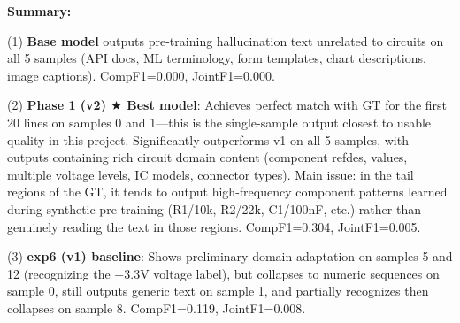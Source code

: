 \textbf{Summary:}

(1) \textbf{Base model} outputs pre-training hallucination text unrelated to circuits on all 5 samples (API docs, ML terminology, form templates, chart descriptions, image captions). CompF1=0.000, JointF1=0.000.

(2) \textbf{Phase 1 (v2) $\bigstar$ Best model}: Achieves perfect match with GT for the first 20 lines on samples 0 and 1---this is the single-sample output closest to usable quality in this project. Significantly outperforms v1 on all 5 samples, with outputs containing rich circuit domain content (component refdes, values, multiple voltage levels, IC models, connector types). Main issue: in the tail regions of the GT, it tends to output high-frequency component patterns learned during synthetic pre-training (R1/10k, R2/22k, C1/100nF, etc.) rather than genuinely reading the text in those regions. CompF1=0.304, JointF1=0.005.

(3) \textbf{exp6 (v1) baseline}: Shows preliminary domain adaptation on samples 5 and 12 (recognizing the +3.3V voltage label), but collapses to numeric sequences on sample 0, still outputs generic text on sample 1, and partially recognizes then collapses on sample 8. CompF1=0.119, JointF1=0.008.



